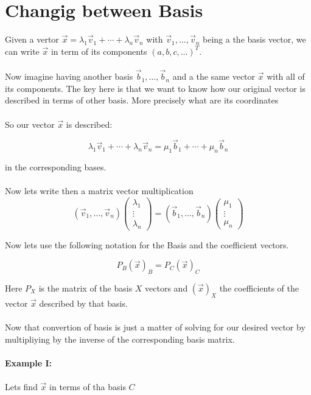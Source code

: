 \section{Changig between Basis}

Given a vertor \(\vec{x} = \lambda_1 \vec{v}_1 + \cdots + \lambda_n \vec{v}_n\) 
with \(\vec{v}_1, \dots, \vec{v}_n\)
being a the basis vector, we can write \(\vec{x}\) in term of its components \((a, b, c, \dots)^T\).
\\\\
Now imagine having another basis \(\vec{b}_1, \dots, \vec{b}_n\) and a the same vector \(\vec{x}\)
with all of its components. The key here is that we want to know how our original
vector is described in terms of other basis. More precisely what are its coordinates
\\\\
So our vector \(\vec{x}\) is described:

\[\lambda_1 \vec{v}_1 + \cdots + \lambda_n \vec{v}_n = \mu_1 \vec{b}_1 + \cdots + \mu_n \vec{b}_n\]

in the corresponding bases.
\\\\
Now lets write then a matrix vector multiplication
\[
(\vec{v}_1, \dots, \vec{v}_ n) 
\begin{pmatrix} \lambda_1 \\ \vdots \\ \lambda_n \end{pmatrix}
 =
(\vec{b}_1, \dots, \vec{b}_ n) 
\begin{pmatrix} \mu_1 \\ \vdots \\ \mu_n \end{pmatrix}
\]

Now lets use the following notation for the Basis and the coefficient vectors.

\[P_B (\vec{x})_B = P_C (\vec{x})_C\]

Here \(P_{X}\) is the matrix of the basis \(X\) vectors and \((\vec{x})_X\) the coefficients of the
vector \(\vec{x}\) described by that basis.
\\\\
Now that convertion of basis is just a matter of solving for 
our desired vector by multipliying
by the inverse of the corresponding basis matrix.
\\\\
\textbf{Example I:}
\\\\
Lets find \(\vec{x}\) in terms of tha basis \(C\)

